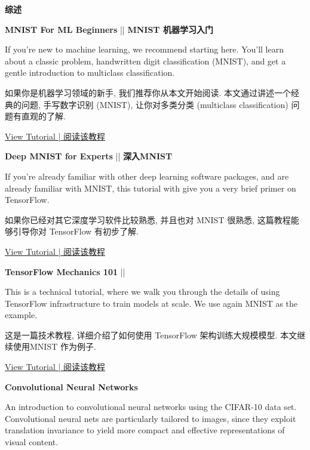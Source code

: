 



\textbf{综述}

\textcolor{etc}{\textbf{MNIST For ML Beginners}}  ||  \textbf{MNIST 机器学习入门}

\textcolor{etc}{If you're new to machine learning, we recommend starting here. You'll learn about a classic problem, handwritten digit classification (MNIST), and get a gentle introduction to multiclass classification.}

如果你是机器学习领域的新手, 我们推荐你从本文开始阅读. 本文通过讲述一个经典的问题, 手写数字识别 (MNIST), 让你对多类分类 (multiclass classification) 问题有直观的了解.

\hyperref[MINIST_beginner]{View Tutorial | 阅读该教程}

\textcolor{etc}{\textbf{Deep MNIST for Experts}}  ||  \textbf{深入MNIST}

\textcolor{etc}{If you're already familiar with other deep learning software packages, and are already familiar with MNIST, this tutorial with give you a very brief primer on TensorFlow.}

如果你已经对其它深度学习软件比较熟悉, 并且也对 MNIST 很熟悉, 这篇教程能够引导你对 TensorFlow 有初步了解.

\hyperref[MINIST_pros]{View Tutorial | 阅读该教程}

\textcolor{etc}{\textbf{TensorFlow Mechanics 101}}  ||  \textbf{}

\textcolor{etc}{This is a technical tutorial, where we walk you through the details of using TensorFlow infrastructure to train models at scale. We use again MNIST as the example.}

这是一篇技术教程, 详细介绍了如何使用 TensorFlow 架构训练大规模模型. 本文继续使用MNIST 作为例子.

\hyperref[tf_mech101]{View Tutorial | 阅读该教程}

\textbf{Convolutional Neural Networks}

An introduction to convolutional neural networks using the CIFAR-10 data set. Convolutional neural nets are particularly tailored to images, since they exploit translation invariance to yield more compact and effective representations of visual content.

